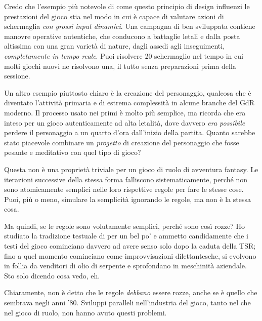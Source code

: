 Credo che l'esempio più notevole di come questo principio di design influenzi le prestazioni del gioco stia nel modo in cui \dnd{} è capace di valutare azioni di schermaglia \textit{con grossi input dinamici}. Una campagna di \dnd{} ben sviluppata contiene manovre operative autentiche, che conducono a battaglie letali e dalla posta altissima con una gran varietà di nature, dagli assedi agli inseguimenti, \textit{completamente in tempo reale}. Puoi risolvere 20 schermaglio nel tempo in cui molti giochi nuovi ne risolvono una, il tutto senza preparazioni prima della sessione.

Un altro esempio piuttosto chiaro è la creazione del personaggio, qualcosa che è diventato l'attività primaria e di estrema complessità in alcune branche del GdR moderno. Il processo usato nei primi \dnd{} è molto più semplice, ma ricorda che era inteso per un gioco autenticamente ad alta letalità, dove davvero \textit{era possibile} perdere il personaggio a un quarto d'ora dall'inizio della partita. Quanto sarebbe stato piacevole combinare un \textit{progetto} di creazione del personaggio che fosse pesante e meditativo con quel tipo di gioco?

Questa non è una proprietà triviale per un gioco di ruolo di avventura fantasy. Le iterazioni successive della stessa forma falliscono sistematicamente, perché non sono atomicamente semplici nelle loro rispettive regole per fare le stesse cose. Puoi, più o meno, simulare la semplicità ignorando le regole, ma non è la stessa cosa.


Ma quindi, se le regole sono volutamente semplici, perché sono così rozze? Ho studiato la tradizione testuale di \dnd{} per un bel po' e ammetto candidamente che i testi del gioco cominciano davvero ad avere senso solo dopo la caduta della TSR; fino a quel momento cominciano come improvvisazioni dilettantesche, si evolvono in follia da venditori di olio di serpente e sprofondano in meschinità aziendale. Sto solo dicendo cosa vedo, eh.

Chiaramente, non è detto che le regole \textit{debbano} essere rozze, anche se è quello che sembrava negli anni '80. Sviluppi paralleli nell'industria del gioco, tanto nel  che nel gioco di ruolo, non hanno avuto questi problemi.

